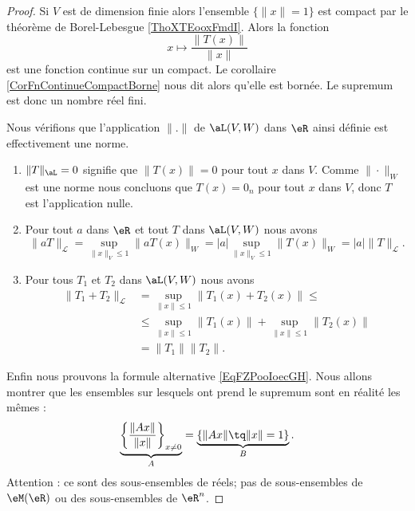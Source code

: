 \begin{proof}
    Si \( V\) est de dimension finie alors l'ensemble $\{ \| x \|= 1 \}$ est compact par le théorème de Borel-Lebesgue \ref{ThoXTEooxFmdI}. Alors la fonction 
    \begin{equation}
        x\mapsto \frac{ \| T(x) \| }{ \| x \| }
    \end{equation}
    est une fonction continue sur un compact. Le corollaire \ref{CorFnContinueCompactBorne} nous dit alors qu'elle est bornée. Le supremum est donc un nombre réel fini.

    Nous vérifions que l'application $\| . \|$ de $\aL(V,W)$ dans $\eR$ ainsi définie est effectivement une norme.
    \begin{enumerate}
        \item
            $\|T\|_{\aL}=0$ signifie que $\|T(x)\|=0$ pour tout $x$ dans $V$. Comme  $\|\cdot\|_W$ est une norme nous concluons que $T(x)=0_{n}$ pour tout $x$ dans $V$, donc $T$ est l'application nulle. 
    \item
        Pour tout $a$ dans $\eR$ et tout  $T$ dans $\aL(V,W)$ nous avons
        \begin{equation}
            \|aT\|_{\mathcal{L}}=\sup_{\|x\|_{V}\leq 1}\|aT(x)\|_{W}=|a|\sup_{\|x\|_{V}\leq 1}\|T(x)\|_{W}=|a|\|T\|_{\mathcal{L}}.
        \end{equation}
    \item 
        Pour tous $T_1$ et $T_2$ dans $\aL(V,W)$ nous avons
      \begin{equation}\nonumber
        \begin{aligned}
           \|T_1+ T_2\|_{\mathcal{L}}&=\sup_{\|x\|\leq 1}\|T_1(x)+T_2(x)\|\leq\\
     &\leq\sup_{\|x\|\leq 1}\|T_1(x)\| +\sup_{\|x\|\leq 1}\|T_2(x)\|\\
     &=\|T_1\|\|T_2\|.
        \end{aligned}
      \end{equation}
    \end{enumerate}


    Enfin nous prouvons la formule alternative \eqref{EqFZPooIoecGH}. Nous allons montrer que les ensembles sur lesquels ont prend le supremum sont en réalité les mêmes :
    \begin{equation}
        \underbrace{\left\{ \frac{ \| Ax \| }{ \| x \| }\right\}_{x\neq 0}}_{A}=\underbrace{\left\{ \| Ax \|\tq \| x \|=1 \right\}}_{B}.
    \end{equation}
    Attention : ce sont des sous-ensembles de réels; pas de sous-ensembles de \( \eM(\eR)\) ou des sous-ensembles de \( \eR^n\).


\end{proof}
